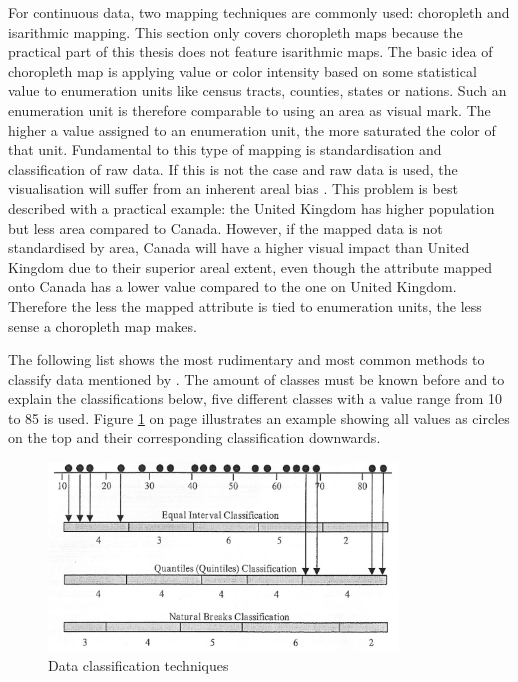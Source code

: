 For continuous data, two mapping techniques are commonly used: choropleth and isarithmic mapping. This section only covers choropleth maps because the practical part of this thesis does not feature isarithmic maps. The basic idea of choropleth map is applying value or color intensity based on some statistical value to enumeration units like census tracts, counties, states or nations. Such an enumeration unit is therefore comparable to using an area as visual mark. The higher a value assigned to an enumeration unit, the more saturated the color of that unit. Fundamental to this type of mapping is standardisation and classification of raw data. If this is not the case and raw data is used, the visualisation will suffer from an inherent areal bias . This problem is best described with a practical example: the United Kingdom has higher population but less area compared to Canada. However, if the mapped data is not standardised by area, Canada will have a higher visual impact than United Kingdom due to their superior areal extent, even though the attribute mapped onto Canada has a lower value compared to the one on United Kingdom. Therefore the less the mapped attribute is tied to enumeration units, the less sense a choropleth map makes.

The following list shows the most rudimentary and most common methods to classify data mentioned by \citeauthor{McMaster2010}. The amount of classes must be known before and to explain the classifications below, five different classes with a value range from 10 to 85 is used. Figure \ref{fig:choropleth-classification} on page \pageref{fig:choropleth-classification} illustrates an example showing all values as circles on the top and their corresponding classification downwards.

\begin{figure}[!htb]
\centering
\includegraphics[height=5cm,keepaspectratio]{images/choropleth/classification.png}
\caption[
    Data classification techniques .
]{Data classification techniques}
\label{fig:choropleth-classification}
\end{figure}

